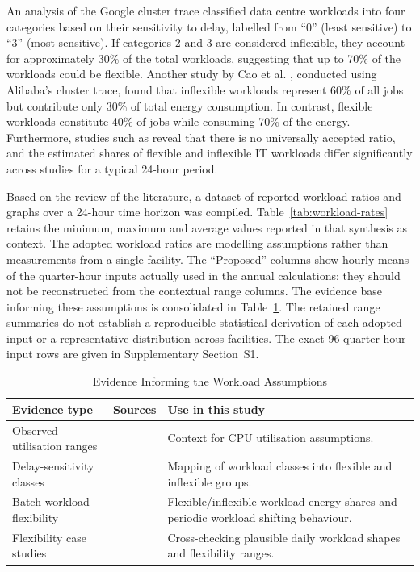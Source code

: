 \documentclass[lettersize,journal]{IEEEtran}
\newcommand{\rev}[1]{#1}
\begin{document}
 An analysis of the Google cluster trace \cite{6779441} classified data centre workloads into four categories based on their sensitivity to delay, labelled from ``0'' (least sensitive) to ``3'' (most sensitive). If categories 2 and 3 are considered inflexible, they account for approximately 30\% of the total workloads, suggesting that up to 70\% of the workloads could be flexible. Another study by Cao et al. \cite{Cao2022ApEn}, conducted using Alibaba’s cluster trace, found that inflexible workloads represent 60\% of all jobs but contribute only 30\% of total energy consumption. In contrast, flexible workloads constitute 40\% of jobs while consuming 70\% of the energy. Furthermore, studies such as \cite{Misaghian2023TIA,Xu2023SPIE,Zhou2024IJEPES,Fu2020ApEn,Liu2012PER} reveal that there is no universally accepted ratio, and the estimated shares of flexible and inflexible IT workloads differ significantly across studies for a typical 24-hour period. 

Based on the review of the literature, a dataset of reported workload ratios and graphs over a 24-hour time horizon was compiled. Table~\ref{tab:workload-rates} retains the minimum, maximum and average values reported in that synthesis as context. The adopted workload ratios are modelling assumptions rather than measurements from a single facility. The ``Proposed'' columns show hourly means of the quarter-hour inputs actually used in the annual calculations; they should not be reconstructed from the contextual range columns. \rev{The evidence base informing these assumptions is consolidated in Table~\ref{tab:workload-source-summary}. The retained range summaries do not establish a reproducible statistical derivation of each adopted input or a representative distribution across facilities. The exact 96 quarter-hour input rows are given in Supplementary Section~S1.}

\begin{table}[!t]
\centering
\caption{\rev{Evidence Informing the Workload Assumptions}}
\label{tab:workload-source-summary}
\begin{scriptsize}
\rev{%
\begin{tabular}{p{}p{}p{0.36\columnwidth}}
\toprule
\textbf{Evidence type} & \textbf{Sources} & \textbf{Use in this study} \\
\midrule
Observed utilisation ranges & \cite{Zaloumis2022IBM,Ghia2011McKinsey} & Context for CPU utilisation assumptions. \\
Delay-sensitivity classes & \cite{6779441} & Mapping of workload classes into flexible and inflexible groups. \\
Batch workload flexibility & \cite{Cao2022ApEn} & Flexible/inflexible workload energy shares and periodic workload shifting behaviour. \\
Flexibility case studies & \cite{Misaghian2023TIA,Xu2023SPIE,Zhou2024IJEPES,Fu2020ApEn,Liu2012PER} & Cross-checking plausible daily workload shapes and flexibility ranges. \\
\bottomrule
\end{tabular}}%
\end{scriptsize}
\end{table}
\end{document}
